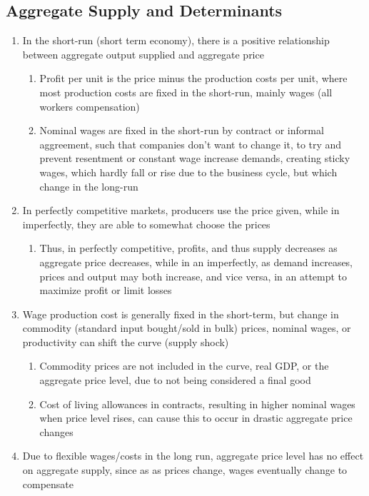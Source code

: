\documentclass[11 pt, twoside]{article}
\begin{document}
\subsection{Aggregate Supply and Determinants}
\begin{enumerate}
\item In the short-run (short term economy), there is a positive relationship between aggregate output supplied and aggregate price
\begin{enumerate}
\item Profit per unit is the price minus the production costs per unit, where most production costs are fixed in the short-run, mainly wages (all workers compensation)
\item Nominal wages are fixed in the short-run by contract or informal aggreement, such that companies don't want to change it, to try and prevent resentment or constant wage increase demands, creating sticky wages, which hardly fall or rise due to the business cycle, but which change in the long-run
\end{enumerate}
\item In perfectly competitive markets, producers use the price given, while in imperfectly, they are able to somewhat choose the prices
\begin{enumerate}
\item Thus, in perfectly competitive, profits, and thus supply decreases as aggregate price decreases, while in an imperfectly, as demand increases, prices and output may both increase, and vice versa, in an attempt to maximize profit or limit losses 
\end{enumerate}
\item Wage production cost is generally fixed in the short-term, but change in commodity (standard input bought/sold in bulk) prices, nominal wages, or productivity can shift the curve (supply shock)
\begin{enumerate}
\item Commodity prices are not included in the curve, real GDP, or the aggregate price level, due to not being considered a final good
\item Cost of living allowances in contracts, resulting in higher nominal wages when price level rises, can cause this to occur in drastic aggregate price changes
\end{enumerate}
\item Due to flexible wages/costs in the long run, aggregate price level has no effect on aggregate supply, since as as prices change, wages eventually change to compensate

\end{enumerate}
\end{document}
